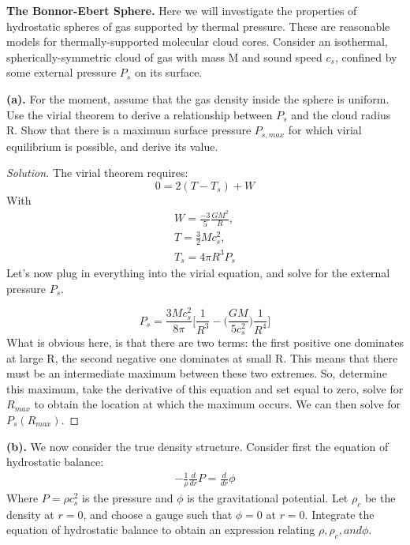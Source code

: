 \documentclass[10pt]{article}
\newenvironment{problem}[2][Problem]{\begin{trivlist}
\item[\hskip \labelsep {\bfseries #1}\hskip \labelsep {\bfseries #2.}]}{\end{trivlist}}
\begin{document}
\begin{problem}{2.1}
\textbf{The Bonnor-Ebert Sphere.}
Here we will investigate the properties of hydrostatic spheres of gas supported by thermal pressure. These are reasonable models for thermally-supported molecular cloud cores. Consider an isothermal, spherically-symmetric cloud of gas with mass M and sound speed $c_{s}$, confined by some external pressure $P_{s}$ on its surface.
\end{problem}

\noindent\textbf{(a).}
For the moment, assume that the gas density inside the sphere is uniform. Use the virial theorem to derive a relationship between $P_{s}$ and the cloud radius R. Show that there is a maximum surface pressure $P_{s,max}$ for which virial equilibrium is possible, and derive its value.
\begin{proof}[Solution]
The virial theorem requires:
\begin{equation}
0 = 2(T - T_{s}) + W
\end{equation}
With 
\begin{align}
W = \frac{-3}{5}\frac{GM^2}{R}, \\
T = \frac{3}{2}Mc_{s}^2, \\
T_{s} = 4\pi R^3 P_{s}
\end{align}
Let's now plug in everything into the virial equation, and solve for the external pressure $P_{s}$.

\begin{equation}
P_{s} = \frac{3Mc_{s}^2}{8\pi}\bigg[\frac{1}{R^3} - \bigg(\frac{GM}{5c_{s}^2}\bigg)\frac{1}{R^4}\bigg]
\end{equation}
What is obvious here, is that there are two terms: the first positive one dominates at large R, the second negative one dominates at small R. This means that there must be an intermediate maximum between these two extremes. So, determine this maximum, take the derivative of this equation and set equal to zero, solve for $R_{max}$ to obtain the location at which the maximum occurs. We can then solve for $P_{s}(R_{max})$. 
\end{proof}
\noindent\textbf{(b).}
We now consider the true density structure. Consider first the equation of hydrostatic balance:
\begin{align}
-\frac{1}{\rho}\frac{d}{dr}P = \frac{d}{dr}\phi
\label{eq:11}
\end{align}
Where $P=\rho c_{s}^2$ is the pressure and $\phi$ is the gravitational potential. Let $\rho_{c}$ be the density at $r=0$, and choose a gauge such that $\phi = 0$ at $r=0$. Integrate the equation of hydrostatic balance to obtain an expression relating $\rho, \rho_{c}, and \phi$.
\end{document}
